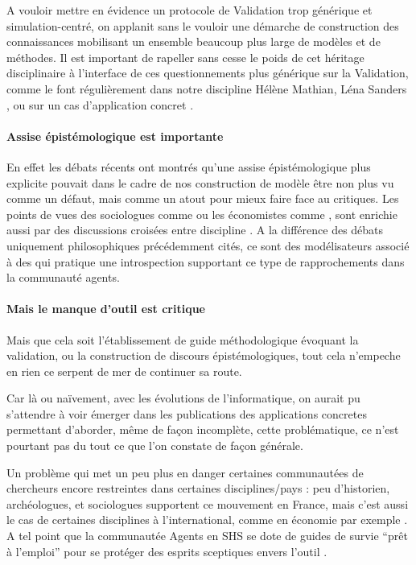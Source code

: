 A vouloir mettre en évidence un protocole de Validation trop générique et simulation-centré, on applanit sans le vouloir une démarche de construction des connaissances mobilisant un ensemble beaucoup plus large de modèles et de méthodes. Il est important de rapeller sans cesse le poids de cet héritage disciplinaire à l'interface de ces questionnements plus générique sur la Validation, comme le font régulièrement dans notre discipline Hélène Mathian, Léna Sanders \textcites{Besse2000, Sanders2000, Mathian2014}, ou sur un cas d'application concret \textcites{Cottineau2014a, Cottineau2014b}.

\paragraph{Assise épistémologique est importante}

En effet les débats récents ont montrés qu'une assise épistémologique plus explicite pouvait dans le cadre de nos construction de modèle être non plus vu comme un défaut, mais comme un atout pour mieux faire face au critiques. Les points de vues des sociologues comme \autocites{Hedstrom2010, Elsenbroich2012, Squazzoni2010, Manzo2007, Gilbert2009, Conte2001} ou les économistes comme \autocite{Epstein1996,Phan}, sont enrichie aussi par des discussions croisées entre discipline \autocite{Amblard2006, Livet2010, Livet2014}. A la différence des débats uniquement philosophiques précédemment cités, ce sont des modélisateurs associé à des  qui pratique une introspection supportant ce type de rapprochements dans la communauté agents. 

\paragraph{Mais le manque d'outil est critique}

Mais que cela soit l'établissement de guide méthodologique évoquant la validation, ou la construction de discours épistémologiques, tout cela n'empeche en rien ce serpent de mer de continuer sa route.

Car là ou naïvement, avec les évolutions de l'informatique, on aurait pu s'attendre à voir émerger dans les publications des applications concretes permettant d'aborder, même de façon incomplète, cette problématique, ce n'est pourtant pas du tout ce que l'on constate de façon générale.

Un problème qui met un peu plus en danger certaines communautées de chercheurs encore restreintes dans certaines disciplines/pays : peu d'historien, archéologues, et sociologues \autocite{Manzo2007} supportent ce mouvement en France, mais c'est aussi le cas de certaines disciplines à l'international, comme en économie par exemple \autocites{Lehtinen2007, Richiardi2006}. A tel point que la communautée Agents en SHS se dote de guides de survie \enquote{prêt à l'emploi} pour se protéger des esprits sceptiques envers l'outil \autocite{Waldherr2013}.

